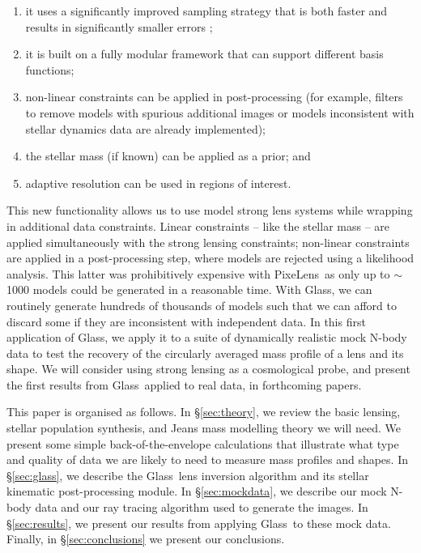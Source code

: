 \documentclass[galley,usenatbib]{mn2e}
\newcommand{\Glass}{{\sc Glass}}
\newcommand{\PixeLens}{{\sc PixeLens}}
\newcommand{\secref}[1] {\S\ref{#1}}
\begin{document}
\begin{enumerate} 
\item it uses a significantly improved sampling strategy that is both faster and results in significantly smaller errors \citep{2012MNRAS.425.3077L};
\item it is built on a fully modular framework that can support different basis functions;
\item non-linear constraints can be applied in post-processing (for example, filters to remove models with spurious additional images or models inconsistent with stellar dynamics data are already implemented);
\item the stellar mass (if known) can be applied as a prior; and
\item adaptive resolution can be used in regions of interest. 
\end{enumerate}

This new functionality allows us to use model strong lens systems while
wrapping in additional data constraints. Linear constraints -- like the stellar
mass -- are applied simultaneously with the strong lensing constraints;
non-linear constraints are applied in a post-processing step, where models are
rejected using a likelihood analysis. This latter was prohibitively expensive
with \PixeLens\ as only up to $\sim$1000 models could be generated in a
reasonable time. With \Glass, we can routinely generate hundreds of thousands
of models such that we can afford to discard some if they are inconsistent with
independent data. In this first application of \Glass, we apply it to a suite
of dynamically realistic mock N-body data to test the recovery of the
circularly averaged mass profile of a lens and its shape. We will consider
using strong lensing as a cosmological probe, and present the first results
from \Glass\ applied to real data, in forthcoming papers.

This paper is organised as follows. In \secref{sec:theory}, we review the basic
lensing, stellar population synthesis, and Jeans mass modelling theory we will
need. We present some simple back-of-the-envelope calculations that illustrate
what type and quality of data we are likely to need to measure mass profiles
and shapes. In \secref{sec:glass}, we describe the \Glass\ lens inversion
algorithm and its stellar kinematic post-processing module. In
\secref{sec:mockdata}, we describe our mock N-body data and our ray tracing
algorithm used to generate the images. In \secref{sec:results}, we present our
results from applying \Glass\ to these mock data. Finally, in
\secref{sec:conclusions} we present our conclusions. 
\end{document}
